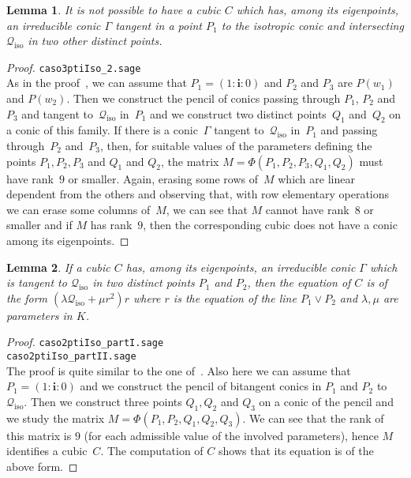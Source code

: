 \documentclass{amsart}
\theoremstyle{plain}
\newtheorem{lemma}{Lemma}[section]
\theoremstyle{definition}
\newcommand{\iso}{\mathcal{Q}_{\mathrm{iso}}}
\newcommand{\iii}{\textbf{i}}
\begin{document}
\begin{lemma}
\label{lemma3ptiSuCiso}
It is not possible to have a cubic $C$ which has, among its eigenpoints,
an irreducible conic $\Gamma$ tangent in a point $P_1$ to the isotropic
conic and intersecting $\iso$ in two other distinct points.
\end{lemma}
\begin{proof}
\verb+caso3ptiIso_2.sage+\\
As in the proof~, we can assume that
$P_1 = (1: \iii: 0)$
and $P_2$ and $P_3$ are $P(w_1)$ and $P(w_2)$. Then we construct
the pencil of conics passing through $P_1$, $P_2$ and $P_3$ and
tangent to~$\iso$ in~$P_1$ and we construct two distinct points~$Q_1$ and~$Q_2$ on a conic of this family. If there is a conic~$\Gamma$
tangent to~$\iso$ in~$P_1$ and passing through~$P_2$ and~$P_3$,
then, for suitable values of the parameters defining the points
$P_1, P_2, P_3$ and $Q_1$ and $Q_2$, the matrix
$M = \Phi(P_1, P_2, P_3, Q_1, Q_2)$
must have rank~$9$ or smaller. Again, erasing some rows of~$M$
which are linear dependent from the others and observing that,
with row elementary operations we can erase some columns of~$M$,
we can see that $M$ cannot have rank~$8$ or smaller and if $M$
has rank~$9$, then the corresponding cubic does not have a conic
among its eigenpoints.
\end{proof}

\begin{lemma}
\label{lemma:bitangentToCiso}
If a cubic $C$ has, among its eigenpoints, an irreducible conic $\Gamma$
which is tangent to $\iso$ in two distinct points $P_1$ and $P_2$, then
the equation of $C$ is of the form $(\lambda \iso + \mu r^2)r$ where
$r$ is the equation of the line $P_1\vee P_2$ and $\lambda, \mu$ are parameters
in $K$.
\end{lemma}
\begin{proof}
\verb+caso2ptiIso_partI.sage+\\
\verb+caso2ptiIso_partII.sage+\\
The proof is quite similar to the one of~. Also
here we can assume that $P_1 = (1: \iii: 0)$ and we construct the pencil of
bitangent conics in $P_1$ and $P_2$ to $\iso$. Then we construct three
points $Q_1, Q_2$ and $Q_3$ on a conic of the pencil
and we study the matrix $M = \Phi(P_1, P_2, Q_1, Q_2, Q_3)$. We can see
that the rank of this matrix is $9$ (for each admissible value of the
involved parameters), hence $M$ identifies a cubic~$C$. The computation
of $C$ shows that its equation is of the above form.
\end{proof}
\end{document}
